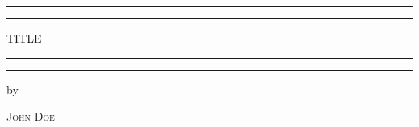\begin{titlepage}

	\centering

	\scshape

	\vspace*{\baselineskip}


	\rule{\textwidth}{1.6pt}\vspace*{-\baselineskip}\vspace*{2pt}

	\rule{\textwidth}{0.4pt}

	\vspace{0.75\baselineskip}

	{\LARGE TITLE \\}

	\vspace{0.75\baselineskip}

	\rule{\textwidth}{0.4pt}\vspace*{-\baselineskip}\vspace{3.2pt}

	\rule{\textwidth}{1.6pt}

	\vspace{2\baselineskip} %


	\vspace*{3\baselineskip} %

	
	by

	\vspace{0.5\baselineskip}

	{\scshape\Large John Doe  \\}

	\vspace*{3\baselineskip} %


\end{titlepage}
